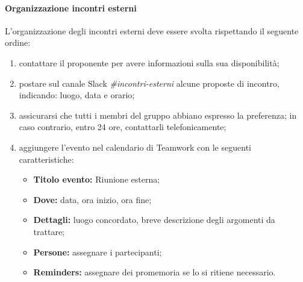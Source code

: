 	        \paragraph{Organizzazione incontri esterni}
	        \label{sec:incontri_esterni}
	        L'organizzazione degli incontri esterni deve essere svolta rispettando il seguente ordine:
	         \begin{enumerate}
		        \item contattare il proponente per avere informazioni sulla sua disponibilità;
		        \item postare sul canale Slack \textit{\#incontri-esterni}{} alcune proposte di incontro, indicando: luogo, data e orario;
		        \item assicurarsi che tutti i membri del gruppo abbiano espresso la preferenza; in caso contrario, entro 24 ore, contattarli telefonicamente;
		        \item aggiungere l'evento nel calendario di Teamwork con le seguenti caratteristiche:
		        \begin{itemize}
		        	\item \textbf{Titolo evento:} Riunione esterna;
		        	\item \textbf{Dove:} data, ora inizio, ora fine;
		        	\item \textbf{Dettagli:} luogo concordato, breve descrizione degli argomenti da trattare;
		        	\item \textbf{Persone:} assegnare i partecipanti;
		        	\item \textbf{Reminders:} assegnare dei promemoria se lo si ritiene necessario.
		        \end{itemize}
	        \end{enumerate}
